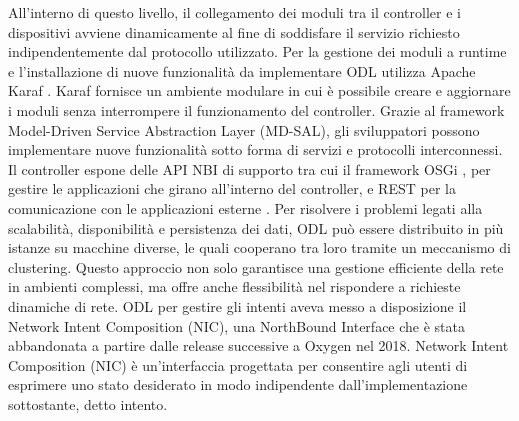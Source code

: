 All'interno di questo livello, il collegamento dei moduli tra il controller e i dispositivi avviene dinamicamente al fine di soddisfare il servizio richiesto indipendentemente dal protocollo utilizzato.
\newline Per la gestione dei moduli a runtime e l'installazione di nuove funzionalità da implementare ODL utilizza Apache Karaf \cite{Apache}.
\newline Karaf fornisce un ambiente modulare in cui è possibile creare e aggiornare i moduli senza interrompere il funzionamento del controller.
\newline Grazie al framework Model-Driven Service Abstraction Layer (MD-SAL), gli sviluppatori possono implementare nuove funzionalità sotto forma di servizi e protocolli interconnessi.
\newline Il controller espone delle API NBI di supporto tra cui il framework OSGi \cite{osgi}, per gestire le applicazioni che girano all'interno del controller,
e REST per la comunicazione con le applicazioni esterne \cite{tesiodl2}.
\newline Per risolvere i problemi legati alla scalabilità, disponibilità e persistenza dei dati, ODL può essere distribuito in più istanze su macchine diverse, le quali cooperano tra loro tramite un meccanismo di clustering. 
Questo approccio non solo garantisce una gestione efficiente della rete in ambienti complessi, ma offre anche flessibilità nel rispondere a richieste dinamiche di rete. 
\newline 
\newline ODL per gestire gli intenti aveva messo a disposizione il Network Intent Composition (NIC), una NorthBound Interface che è stata abbandonata a partire dalle release successive a Oxygen nel 2018.
\newline Network Intent Composition (NIC) \cite{nic} è un'interfaccia progettata per consentire agli utenti di esprimere uno stato desiderato in modo indipendente dall'implementazione sottostante, detto intento. 
